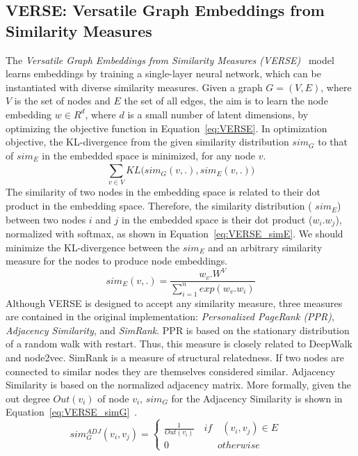 \subsection{VERSE: Versatile Graph Embeddings from Similarity Measures}
\label{subsec:VERSE}
The \emph{Versatile Graph Embeddings from Similarity Measures (VERSE)}~ model learns embeddings by training a single-layer neural network, which can be instantiated with diverse similarity measures. Given a graph $G=(V,E)$, where $V$ is the set of nodes and $E$ the set of all edges, the aim is to learn the node embedding $w \in R^{d}$, where $d$ is a small number of latent dimensions, by optimizing the objective function in Equation~\ref{eq:VERSE}. In optimization objective, the KL-divergence from the given similarity distribution $sim_G$ to that of $sim_E$ in the embedded space is minimized, for any node $v$. 
\begin{equation}
\sum _{ v\in V }^{  }{ KL(sim_{ G }(v,.),sim_{ E } } (v,.))
\label{eq:VERSE}
\end{equation}
The similarity of two nodes in the embedding space is related to their dot product in the embedding space. Therefore, the similarity distribution ( $sim_E$) between two nodes $i$ and $j$ in the embedded space is their dot product ($w_i . w_j$), normalized with softmax, as shown in Equation~\ref{eq:VERSE_simE}. We should minimize the KL-divergence between the $sim_{ E }$ and an arbitrary similarity measure for the nodes to produce node embeddings. 
\begin{equation}
sim_{ E }(v,.)=\frac{ w_{ v }.W^{ V } }{ \sum _{ i=1 }^{ n }{ exp(w_{ v }.w_{ i }) }  }\label{eq:VERSE_simE}
\end{equation}
Although VERSE is designed to accept any similarity measure, three measures are contained in the original implementation: \emph{Personalized PageRank (PPR)},  \emph{Adjacency Similarity}, and  \emph{SimRank}. PPR is based on the stationary distribution of a random walk with restart. Thus, this measure is closely related to DeepWalk and node2vec. SimRank is a measure of structural relatedness. If two nodes are connected to similar nodes they are themselves considered similar. Adjacency Similarity is based on the normalized adjacency matrix. More formally, given the out degree $Out(v_{i})$ of node $v_{i}$, $sim_{ G }$ for the Adjacency Similarity is shown in Equation~\ref{eq:VERSE_simG}~. 
\begin{equation}
sim^{ ADJ }_{ G }(v_{ i },v_{ j })=\left\{ \begin{matrix} \frac { 1 }{ Out(v_{ i }) } \quad if\quad (v_{ i },v_{ j })\in E\quad  \\ 0\quad \qquad \qquad otherwise \end{matrix} \right.\label{eq:VERSE_simG}
\end{equation}
